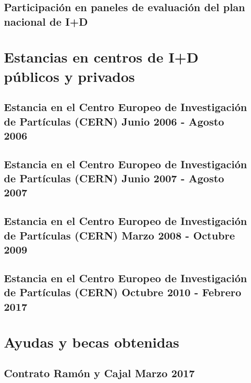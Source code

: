 \documentclass[a4paper, 11pt, twoside, openright]{report}
\begin{document}
\subsection{Participación en paneles de evaluación del plan nacional de I+D}



\section{Estancias en centros de I+D públicos y privados}
\subsection{Estancia en el Centro Europeo de Investigación de Partículas (CERN) Junio 2006 - Agosto 2006}

\subsection{Estancia en el Centro Europeo de Investigación de Partículas (CERN) Junio 2007 - Agosto 2007}

\subsection{Estancia en el Centro Europeo de Investigación de Partículas (CERN) Marzo 2008 - Octubre 2009}

\subsection{Estancia en el Centro Europeo de Investigación de Partículas (CERN) Octubre 2010 - Febrero 2017}



\section{Ayudas y becas obtenidas}
\subsection{Contrato Ramón y Cajal Marzo 2017}

\end{document}
